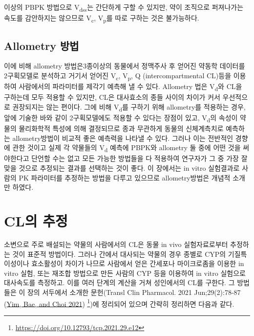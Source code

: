 \documentclass[
  11pt,
  krantz2, a4paper, twoside]{krantz}
\begin{document}
이상의 PBPK 방법으로 V\textsubscript{dss}는 간단하게 구할 수 있지만, 약이 조직으로
퍼져나가는 속도를 감안하지는 않으므로 V\textsubscript{c}, V\textsubscript{p}를 따로 구하는 것은
불가능하다.

\hypertarget{allometry-uxbc29uxbc95}{%
\subsection{Allometry 방법}\label{allometry-uxbc29uxbc95}}

이에 비해 allometry 방법은3종이상의 동물에서 정맥주사 후 얻어진 약동학
데이터를 2구획모델로 분석하고 거기서 얻어진 V\textsubscript{c}, V\textsubscript{p}, Q
(intercompartmental CL)등을 이용하여 사람에서의 파라미터를 제각기 예측해
낼 수 있다. Allometry 법은 V\textsubscript{d}와 CL을 구하는데 모두 적용할 수 있지만,
CL은 대사효소의 종들 사이의 차이가 커서 우선적으로 권장되지는 않는
편이다. 그에 비해 V\textsubscript{d}를 구하기 위해 allometry를 적용하는 경우, 앞에
기술한 바와 같이 2구획모델에도 적용할 수 있다는 장점이 있고, V\textsubscript{d}의
속성이 약물의 물리화학적 특성에 의해 결정되므로 종과 무관하게 동물의
신체계측치로 예측하는 allometry방법이 비교적 좋은 예측력을 나타낼 수
있다. 그러나 이는 전반적인 경향에 관한 것이고 실제 각 약물들의 V\textsubscript{d}
예측에 PBPK와 allometry 둘 중에 어떤 것을 써야한다고 단언할 수는 없고
모든 가능한 방법들을 다 적용하여 연구자가 그 중 가장 잘 맞을 것으로
추정되는 결과를 선택하는 것이 좋다. 이 장에서는 in vitro 실험결과로
사람의 PK 파라미터를 추정하는 방법을 다루고 있으므로 allometry방법은
개념적 소개만 하였다.

\hypertarget{cluxc758-uxcd94uxc815}{%
\section{CL의 추정}\label{cluxc758-uxcd94uxc815}}

소변으로 주로 배설되는 약물의 사람에서의 CL은 동물 in vivo
실험자료로부터 추정하는 것이 표준적 방법이다. 그러나 간에서 대사되는
약물의 경우 종별로 CYP의 기질특이성이나 효소활성이 차이가 나므로
사람에서 얻은 간세포나 마이크로좀을 이용한 in vitro 실험, 또는 재조합
방법으로 만든 사람의 CYP 등을 이용하여 in vitro 실험으로 대사속도를
측정하고. 이를 여러 단계의 계산을 거쳐 성인에서의 CL를 구한다. 그
방법들은 이 장의 서두에서 소개한 문헌(Transl Clin Pharmacol. 2021
Jun;29(2):78-87 (\protect\hyperlink{ref-yim2021predicting}{Yim, Bae, and Choi 2021}) \footnote{\url{https://doi.org/10.12793/tcp.2021.29.e12}})에 정리되어
있으며 간략히 정리하면 다음과 같다.
\end{document}
